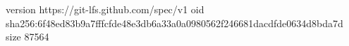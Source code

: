 version https://git-lfs.github.com/spec/v1
oid sha256:6f48ed83b9a7fffcfde48e3db6a33a0a0980562f246681dacdfde0634d8bda7d
size 87564
